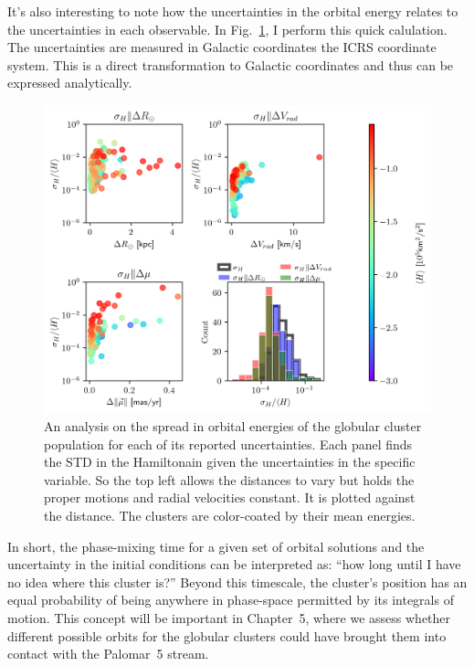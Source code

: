             It's also interesting to note how the uncertainties in the orbital energy relates to the uncertainties in each observable. In Fig.~\ref{fig:energy_sensitivity_analysis_MWGCS_to_distance_RV_mu}, I perform this quick calulation. The uncertainties are measured in Galactic coordinates the ICRS coordinate system. This is a direct transformation to Galactic coordinates and thus can be expressed analytically.
            \begin{figure}[p]
                \includegraphics[width=\linewidth]{images/energy_sensitivity_analysis_MWGCS_to_errors.png}
                \caption{An analysis on the spread in orbital energies of the globular cluster population for each of its reported uncertainties. Each panel finds the STD in the Hamiltonain given the uncertainties in the specific variable. So the top left allows the distances to vary but holds the proper motions and radial velocities constant. It is plotted against the distance. The clusters are color-coated by their mean energies.}
                \label{fig:energy_sensitivity_analysis_MWGCS_to_distance_RV_mu}
            \end{figure}
            In short, the phase-mixing time for a given set of orbital solutions and the uncertainty in the initial conditions can be interpreted as: ``how long until I have no idea where this cluster is?'' Beyond this timescale, the cluster's position has an equal probability of being anywhere in phase-space permitted by its integrals of motion. This concept will be important in Chapter~5, where we assess whether different possible orbits for the globular clusters could have brought them into contact with the Palomar~5 stream.
